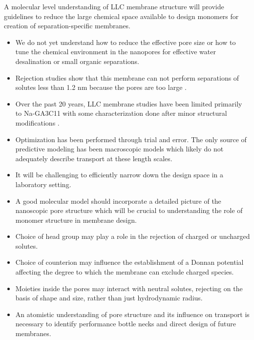 \documentclass{article}
\begin{document}
  A molecular level understanding of LLC membrane structure will provide guidelines
  to reduce the large chemical space available to design monomers for creation of 
  separation-specific membranes.
  \begin{itemize}
    \item  We do not yet understand how to reduce the effective pore size or 
    how to tune the chemical environment in the nanopores for effective water
    desalination or small organic separations.
    \item Rejection studies show that this membrane can not perform separations of
    solutes less than 1.2 nm because the pores are too large \cite{zhou_supported_2005}.
    \item Over the past 20 years, LLC membrane studies have been limited primarily 
    to Na-GA3C11 with some characterization done after minor structural modifications
    \cite{resel_structural_2000}. 
    \item Optimization has been performed through trial and error. The only source of 
    predictive modeling has been macroscopic models which likely do not adequately describe 
    transport at these length scales. %
    \item It will be challenging to efficiently narrow down the design space in 
    a laboratory setting.
    \item A good molecular model should incorporate a detailed picture of the nanoscopic pore 
    structure which will be crucial to understanding the role of monomer structure in 
    membrane design.
    \item Choice of head group may play a role in the rejection of charged or uncharged solutes.
    \item Choice of counterion may influence the establishment of a Donnan potential 
    affecting the degree to which the membrane can exclude charged species.
    \item Moieties inside the pores may interact with neutral solutes, rejecting
    on the basis of shape and size, rather than just hydrodynamic radius.
    \item  An atomistic understanding of pore structure and its influence on transport 
    is necessary to identify performance bottle necks and direct design of future membranes. 
  \end{itemize}
  
\end{document}
